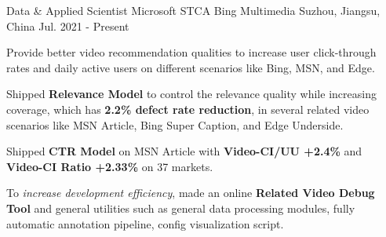 

\begin{cventries}

  \cventry
    {Data \& Applied Scientist} %
    {Microsoft STCA Bing Multimedia} %
    {Suzhou, Jiangsu, China} %
    {Jul. 2021 - Present} %
    {
      \begin{cvitems} %
        \item {Provide better video recommendation qualities to increase user click-through rates and daily active users on different scenarios like Bing, MSN, and Edge.}
        \item {Shipped \textbf{Relevance Model} to control the relevance quality while increasing coverage, which has \textbf{2.2\% defect rate reduction}, in several related video scenarios like MSN Article, Bing Super Caption, and Edge Underside.}
        \item {Shipped \textbf{CTR Model} on MSN Article with \textbf{Video-CI/UU +2.4\%} and \textbf{Video-CI Ratio +2.33\%} on 37 markets.}
        \item {To \textit{increase development efficiency}, made an online \textbf{Related Video Debug Tool} and general utilities such as general data processing modules, fully automatic annotation pipeline, config visualization script.}
      \end{cvitems}
    }


\end{cventries}
